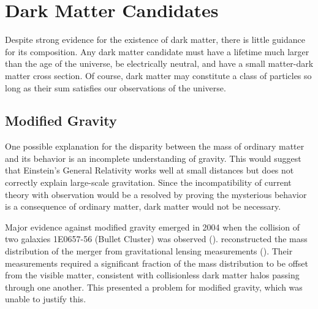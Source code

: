 


\section[Dark Matter Candidates][Dark Matter Candidates]{Dark Matter Candidates}
\label{sec:dmcandidates}
Despite strong evidence for the existence of dark matter, there is little guidance for its composition.  Any dark matter candidate must
have a lifetime much larger than the age of the universe, be electrically
neutral, and have a small matter-dark matter cross section.  Of course, dark matter may constitute a class of particles so long as their
sum satisfies our observations of the universe.



\subsection{Modified Gravity}
\label{subsec:modified_gravity}
One possible explanation for the disparity between the mass of ordinary matter and its behavior is an incomplete understanding of
gravity.  This
would suggest that Einstein's General Relativity works well at small distances but does not correctly explain large-scale
gravitation.  Since the incompatibility of current theory with observation would be a resolved by proving the mysterious behavior is
a consequence of ordinary matter, dark matter would not be necessary.

Major evidence against modified gravity emerged in 2004 when the collision of two galaxies 1E0657-56 (Bullet Cluster) was observed
().   reconstructed the mass distribution of the merger from gravitational
lensing measurements ().  Their measurements required a significant fraction of the mass
distribution to be offset from the visible matter, consistent with collisionless dark matter halos passing through one another.  This
presented a problem for modified gravity, which was unable to justify this.

